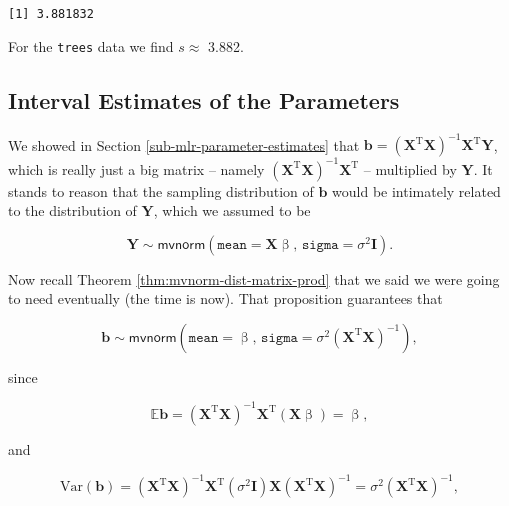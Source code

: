 \documentclass[]{book}
\numberwithin{equation}{chapter}
\numberwithin{figure}{chapter}
\theoremstyle{plain}
\theoremstyle{definition}
\theoremstyle{remark}
\theoremstyle{definition}
\theoremstyle{definition}
\theoremstyle{remark}
\begin{document}
\begin{verbatim}
[1] 3.881832
\end{verbatim}

For the \texttt{trees} data we find \(s \approx\) 3.882.

\subsection{Interval Estimates of the
Parameters}\label{sub-mlr-interval-est-params}

We showed in Section \ref{sub-mlr-parameter-estimates} that
\(\mathbf{b}=\left(\mathbf{X}^{\mathrm{T}}\mathbf{X}\right)^{-1}\mathbf{X}^{\mathrm{T}}\mathbf{Y}\),
which is really just a big matrix -- namely
\(\left(\mathbf{X}^{\mathrm{T}}\mathbf{X}\right)^{-1}\mathbf{X}^{\mathrm{T}}\)
-- multiplied by \(\mathbf{Y}\). It stands to reason that the sampling
distribution of \(\mathbf{b}\) would be intimately related to the
distribution of \(\mathbf{Y}\), which we assumed to be

\begin{equation}
\mathbf{Y}\sim\mathsf{mvnorm}\left(\mathtt{mean}=\mathbf{X}\upbeta,\,\mathtt{sigma}=\sigma^{2}\mathbf{I}\right).
\end{equation}

Now recall Theorem \ref{thm:mvnorm-dist-matrix-prod} that we said we
were going to need eventually (the time is now). That proposition
guarantees that

\begin{equation}
\label{eq-distn-b-mlr}
\mathbf{b}\sim\mathsf{mvnorm}\left(\mathtt{mean}=\upbeta,\,\mathtt{sigma}=\sigma^{2}\left(\mathbf{X}^{\mathrm{T}}\mathbf{X}\right)^{-1}\right),
\end{equation}

since

\begin{equation}
\mathbb{E}\mathbf{b}=\left(\mathbf{X}^{\mathrm{T}}\mathbf{X}\right)^{-1}\mathbf{X}^{\mathrm{T}}(\mathbf{X}\upbeta)=\upbeta,
\end{equation}

and

\begin{equation}
\mbox{Var}(\mathbf{b})=\left(\mathbf{X}^{\mathrm{T}}\mathbf{X}\right)^{-1}\mathbf{X}^{\mathrm{T}}(\sigma^{2}\mathbf{I})\mathbf{X}\left(\mathbf{X}^{\mathrm{T}}\mathbf{X}\right)^{-1}=\sigma^{2}\left(\mathbf{X}^{\mathrm{T}}\mathbf{X}\right)^{-1},
\end{equation}
\end{document}
